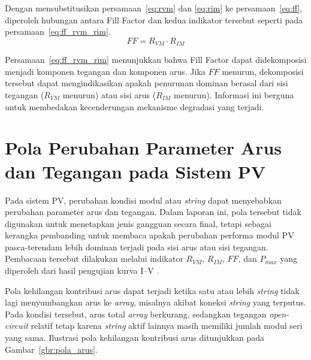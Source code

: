 Dengan mensubstitusikan persamaan~\eqref{eq:rvm} dan \eqref{eq:rim} ke
persamaan~\eqref{eq:ff}, diperoleh hubungan antara Fill Factor dan kedua
indikator tersebut seperti pada persamaan~\eqref{eq:ff_rvm_rim}.
\begin{equation}
FF = R_{VM} \cdot R_{IM}
\label{eq:ff_rvm_rim}
\end{equation}

Persamaan~\eqref{eq:ff_rvm_rim} menunjukkan bahwa Fill Factor dapat
didekomposisi menjadi komponen tegangan dan komponen arus. Jika $FF$ menurun,
dekomposisi tersebut dapat mengindikasikan apakah penurunan dominan berasal
dari sisi tegangan ($R_{VM}$ menurun) atau sisi arus ($R_{IM}$ menurun).
Informasi ini berguna untuk membedakan kecenderungan mekanisme degradasi yang
terjadi.
\section{Pola Perubahan Parameter Arus dan Tegangan pada Sistem PV}

Pada sistem PV, perubahan kondisi modul atau \textit{string} dapat
menyebabkan perubahan parameter arus dan tegangan. Dalam laporan ini, pola
tersebut tidak digunakan untuk menetapkan jenis gangguan secara final, tetapi
sebagai kerangka pembanding untuk membaca apakah perubahan performa modul PV
pasca-terendam lebih dominan terjadi pada sisi arus atau sisi tegangan.
Pembacaan tersebut dilakukan melalui indikator $R_{VM}$, $R_{IM}$, $FF$, dan
$P_{max}$ yang diperoleh dari hasil pengujian kurva I--V
\cite{pei2019,sugirianta2022}.

Pola kehilangan kontribusi arus dapat terjadi ketika satu atau lebih
\textit{string} tidak lagi menyumbangkan arus ke \textit{array}, misalnya
akibat koneksi \textit{string} yang terputus. Pada kondisi tersebut, arus total
\textit{array} berkurang, sedangkan tegangan \textit{open-circuit} relatif
tetap karena \textit{string} aktif lainnya masih memiliki jumlah modul seri
yang sama. Ilustrasi pola kehilangan kontribusi arus ditunjukkan pada
Gambar~\ref{gbr:pola_arus}.


